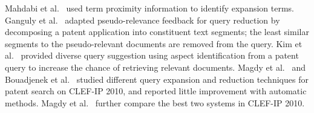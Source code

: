 Mahdabi et al.~\cite{Mahdabi2013} used term proximity
information to identify expansion terms. Ganguly et
al.~\cite{ganguly2011patent} adapted pseudo-relevance feedback for
query reduction by decomposing a patent application into constituent
text segments; 
the least similar
segments to the pseudo-relevant documents are removed from the query.
Kim et al.~\cite{kim2014diversifying} provided diverse query suggestion using
aspect identification from a patent query to increase the chance of
retrieving relevant documents. Magdy et al.~\cite{magdy2011study} 
and Bouadjenek et al.~\cite{Bouadjenek2015} 
studied different query expansion and reduction techniques 
for patent search on CLEF-IP 2010, 
and reported little improvement with automatic methods. 
Magdy et al.~\cite{magdy2011simple} further 
compare the best two systems in CLEF-IP 2010.
\begin{comment}
discussed that standard query expansion techniques are
less effective in patent retrieval, where the initial query is the full texts of query
patents. 
\end{comment}












